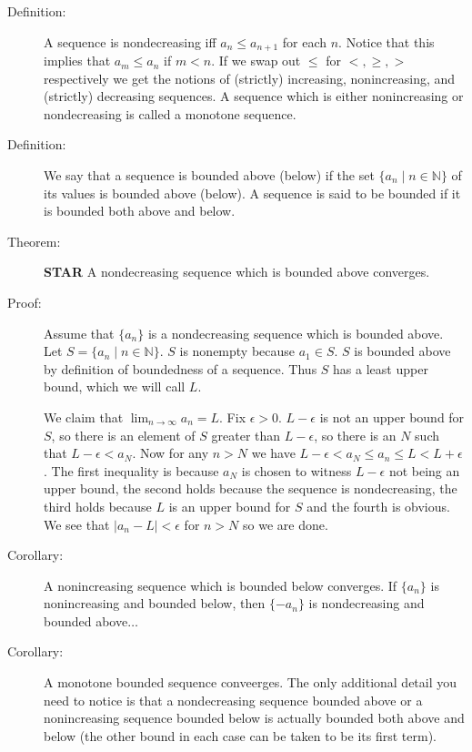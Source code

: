 \documentclass[12pt]{article}
\begin{document}
\begin{description}

\item[Definition:]  A sequence is nondecreasing iff $a_n \leq a_{n+1}$ for each $n$.  Notice that this implies that $a_m \leq a_n$ if $m<n$.  If we swap out $\leq$ for $<, \geq, >$ respectively we get the notions
of (strictly) increasing, nonincreasing, and (strictly) decreasing sequences.  A sequence which is either nonincreasing or nondecreasing is called a monotone sequence.

\item[Definition:]  We say that a sequence is bounded above (below) if the set $\{a_n \mid n \in {\mathbb N}\}$ of its values is bounded above (below).  A sequence is said to be bounded if it is bounded both above and below.


\item[Theorem:]  {\bf STAR}  A nondecreasing sequence which is bounded above converges.

\item[Proof:]  Assume that $\{a_n\}$ is a nondecreasing sequence which is bounded above.  Let $S=\{a_n \mid n \in {\mathbb N}\}$.  $S$ is nonempty because $a_1 \in S$.  $S$ is bounded above by definition of boundedness of a sequence.
Thus $S$ has a least upper bound, which we will call $L$.

We claim that $\lim_{n \rightarrow \infty}a_n = L$.  Fix $\epsilon>0$.  $L-\epsilon$ is not an upper bound for $S$, so there is an element of $S$ greater than $L-\epsilon$, so there is an $N$ such that
$L-\epsilon<a_N$.  Now for any $n>N$ we have $L-\epsilon<a_N\leq a_n\leq L <L+\epsilon$.  The first inequality is because $a_N$ is chosen to witness $L-\epsilon$ not being an upper bound, the second holds because the sequence is nondecreasing, the third holds because $L$ is an upper bound for $S$ and the fourth is obvious.  We see that $|a_n-L|<\epsilon$ for $n>N$ so we are done.

\item[Corollary:]  A nonincreasing sequence which is bounded below converges.  If $\{a_n\}$ is nonincreasing and bounded below, then $\{-a_n\}$ is nondecreasing and bounded above$\ldots$

\item[Corollary:]  A monotone bounded sequence conveerges.  The only additional detail you need to notice is that a nondecreasing sequence bounded above or a nonincreasing sequence bounded below is actually bounded both above and below (the other bound in each case can be taken to be its first term).

\end{description}
\end{document}
